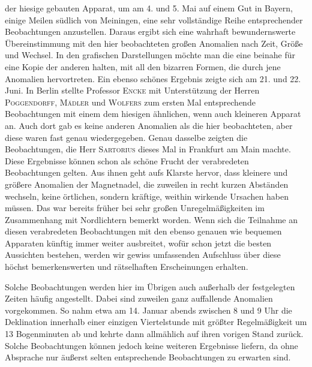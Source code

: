 der hiesige gebauten Apparat, um am 4. und 5. Mai auf einem Gut in Bayern, einige Meilen südlich von Meiningen, eine sehr vollständige Reihe entsprechender Beobachtungen anzustellen. Daraus ergibt sich eine wahrhaft bewundernswerte Übereinstimmung mit den hier beobachteten großen Anomalien nach Zeit, Größe und Wechsel. In den grafischen Darstellungen möchte man die eine beinahe für eine Kopie der anderen halten, mit all den bizarren Formen, die durch jene Anomalien hervortreten. Ein ebenso schönes Ergebnis zeigte sich am 21. und 22. Juni. In Berlin stellte Professor \textsc{Encke} mit Unterstützung der Herren \textsc{Poggendorff}, \textsc{Mädler} und \textsc{Wolfers} zum ersten Mal entsprechende Beobachtungen mit einem dem hiesigen ähnlichen, wenn auch kleineren Apparat an. Auch dort gab es keine anderen Anomalien als die hier beobachteten, aber diese waren fast genau wiedergegeben. Genau dasselbe zeigten die Beobachtungen, die Herr \textsc{Sartorius} dieses Mal in Frankfurt am Main machte. Diese Ergebnisse können schon als schöne Frucht der verabredeten Beobachtungen gelten. Aus ihnen geht aufs Klarste hervor, dass kleinere und größere Anomalien der Magnetnadel, die zuweilen in recht kurzen Abständen wechseln, keine örtlichen, sondern kräftige, weithin wirkende Ursachen haben müssen. Das war bereits früher bei sehr großen Unregelmäßigkeiten im Zusammenhang mit Nordlichtern bemerkt worden. Wenn sich die Teilnahme an diesen verabredeten Beobachtungen mit den ebenso genauen wie bequemen Apparaten künftig immer weiter ausbreitet, wofür schon jetzt die besten Aussichten bestehen, werden wir gewiss umfassenden Aufschluss über diese höchst bemerkenswerten und rätselhaften Erscheinungen erhalten.

Solche Beobachtungen werden hier im Übrigen auch außerhalb der festgelegten Zeiten häufig angestellt. Dabei sind zuweilen ganz auffallende Anomalien vorgekommen. So nahm etwa am 14. Januar abends zwischen 8 und 9 Uhr die Deklination innerhalb einer einzigen Viertelstunde mit größter Regelmäßigkeit um 13 Bogenminuten ab und kehrte dann allmählich auf ihren vorigen Stand zurück. Solche Beobachtungen können jedoch keine weiteren Ergebnisse liefern, da ohne Absprache nur äußerst selten entsprechende Beobachtungen zu erwarten sind.

